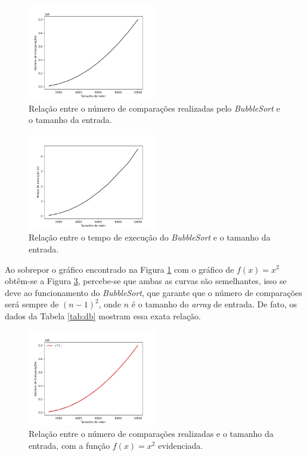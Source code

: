 \documentclass[12pt,a4paper,oneside]{article}
\begin{document}
\begin{figure}[H]
\begin{center}
    \includegraphics[width=0.5\textwidth]{FigNB.png} 
\end{center}
\caption{Relação entre o número de comparações realizadas pelo \textit{BubbleSort} e o tamanho da entrada.}
\label{fig:nb}
\end{figure}

\begin{figure}[H]
\begin{center}
    \includegraphics[width=0.5\textwidth]{FigTB.png} 
\end{center}
\caption{Relação entre o tempo de execução do \textit{BubbleSort} e o tamanho da entrada.}
\label{fig:tb}
\end{figure}

\quad Ao sobrepor o gráfico encontrado na Figura \ref{fig:nb} com o gráfico de $f(x)=x^2$ obtêm-se a Figura \ref{fig:bOK}, percebe-se que ambas as curvas são semelhantes, isso se deve ao funcionamento do \textit{BubbleSort}, que garante que o número de comparações será sempre de $(n-1)^2$, onde $n$ é o tamanho do \textit{array} de entrada. De fato, os dados da Tabela \ref{tab:db} mostram essa exata relação.

\begin{figure}[H]
\begin{center}
    \includegraphics[width=0.5\textwidth]{FigBn2.png} 
\end{center}
\caption{Relação entre o número de comparações realizadas e o tamanho da entrada, com a função $f(x)=x^2$ evidenciada.}
\label{fig:bOK}
\end{figure}
\end{document}
